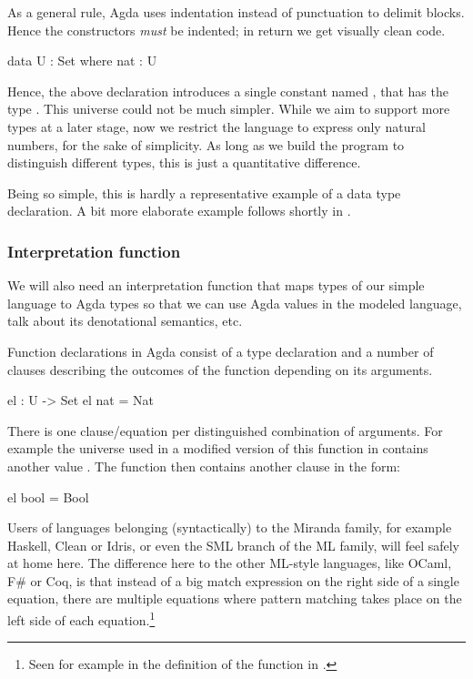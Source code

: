 As a general rule, Agda uses indentation instead of punctuation to delimit
blocks. Hence the constructors \emph{must} be indented; in return we get
visually clean code.

\begin{code}
  data U : Set where
    nat : U
\end{code}

\noindent Hence, the above declaration introduces a single constant named ,
that has the type . This universe could not be much simpler. While we aim to support more
types at a later stage, now we restrict the language to express only natural
numbers, for the sake of simplicity. As long as we build the program to
distinguish different types, this is just a quantitative difference.

Being so simple, this is hardly a representative example of a data type
declaration. A bit more elaborate example follows shortly in .

\subsubsection{Interpretation function}

We will also need an interpretation function that maps
types of our simple language to Agda types so that we can use Agda values in
the modeled language, talk about its denotational semantics, etc.

Function declarations in Agda consist of a type declaration and a
number of clauses describing the outcomes of the function depending on
its arguments.

\begin{code}
  el : U -> Set
  el nat = Nat
\end{code}

\noindent There is one clause/equation per distinguished combination of arguments. For
example the universe  used in a modified version of this function in 
contains another value . The function  then contains another clause
in the form:
\begin{code}
  el bool = Bool
\end{code}
Users of languages belonging (syntactically) to the Miranda family, for example Haskell, Clean
or Idris, or even the SML branch of the ML family, will feel safely at
home here. The difference here to the other ML-style languages, like OCaml, F\# or Coq, is that
instead of a big match
expression on the right side of a single equation, there are multiple equations where pattern
matching takes place on the left side of each equation.\footnote{Seen for example in
the definition of the function  in .}

